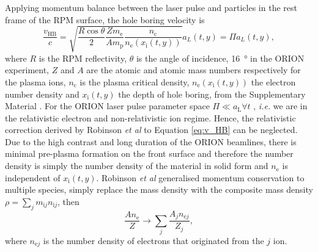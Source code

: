 Applying momentum balance between the laser pulse and particles in the rest frame of the \ac{RPM} surface, the hole boring velocity is
\begin{equation}\label{eq:v_HB}
	\frac{v_\mathrm{HB}}{c} = \sqrt{\frac{R\cos\theta}{2}\frac{Zm_\mathrm{e}}{Am_\mathrm{p}}\frac{n_\mathrm{c}}{n_\mathrm{e}(x_\mathrm{i}(t,y))}}a_L(t,y) = \Pi a_L(t,y),
\end{equation}
where $R$ is the RPM reflectivity, $\theta$ is the angle of incidence, \qty{16}{\degree} in the ORION experiment, $Z$ and $A$ are the atomic and atomic mass numbers respectively for the plasma ions, $n_\mathrm{c}$ is the plasma critical density, $n_\mathrm{e}(x_\mathrm{i}(t,y))$ the electron number density and $x_\mathrm{i}(t,y)$
the depth of hole boring, from the Supplementary Material \cite{vincentiOpticalPropertiesRelativistic2014}. For the ORION laser pulse parameter space $\Pi \ll a_\mathrm{L}\forall t$ , \textit{i.e.} we are in the relativistic electron and non-relativistic ion regime. Hence, the relativistic correction derived by Robinson \textit{et al} \cite{robinsonRelativisticallyCorrectHoleboring2009} to Equation \ref{eq:v_HB} can be neglected. Due to the high contrast and long duration of the ORION beamlines, there is minimal pre-plasma formation on the front surface and therefore the number density is simply the number density of the material in solid form and $n_\mathrm{e}$ is independent of $x_\mathrm{i}(t,y)$. Robinson \textit{et al} \cite{robinsonHoleboringRadiationPressure2009} generalised momentum conservation to multiple species, simply replace the mass density with the composite mass density $\rho = \sum_j m_{\mathrm{i}j}n_{\mathrm{i}j}$, then
\begin{equation}
	\frac{An_\mathrm{e}}{Z} \to \sum_j \frac{A_jn_{\mathrm{e}j}}{Z_j},
\end{equation}
where $n_{\mathrm{e}j}$ is the number density of electrons that originated from the $j$ ion.



